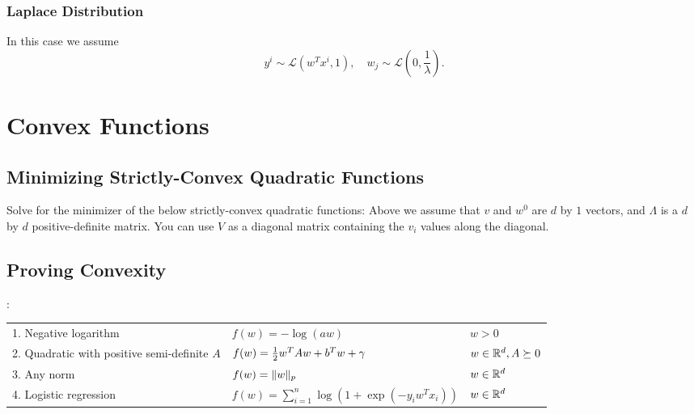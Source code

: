 \documentclass{article}
\begin{document}
\subsubsection*{Laplace Distribution}
In this case we assume
\begin{equation*}
y^i \sim \mathcal{L}(w^Tx^i,1), \quad w_j \sim \mathcal{L}\left(0,\frac{1}{\lambda}\right).
\end{equation*}
\section{Convex Functions}


\subsection{Minimizing Strictly-Convex Quadratic Functions}

Solve for the minimizer of the below strictly-convex quadratic functions:
Above we assume that $v$ and $w^0$ are $d$ by $1$ vectors, and $\Lambda$ is a $d$ by $d$ positive-definite matrix. You can use $V$ as a diagonal matrix containing the $v_i$ values along the diagonal.



\subsection{Proving Convexity}

:
\begin{center}
\begin{tabular}{lll}
1. Negative logarithm & $f(w) = -\log(aw) $ & $w > 0$\\
2. Quadratic with positive semi-definite $A$ & $f(w) = \frac 1 2 w^TAw + b^Tw + \gamma$ & $w \in \mathbb{R}^d, A \succeq 0$ \\
3. Any norm & $f(w) = \|w\|_p$ & $w \in \mathbb{R}^d$\\
4. Logistic regression & $f(w) = \sum_{i=1}^n \log(1+\exp(-y_iw^Tx_i))$ & $w \in \mathbb{R}^d$
\end{tabular}
\end{center}
\end{document}
